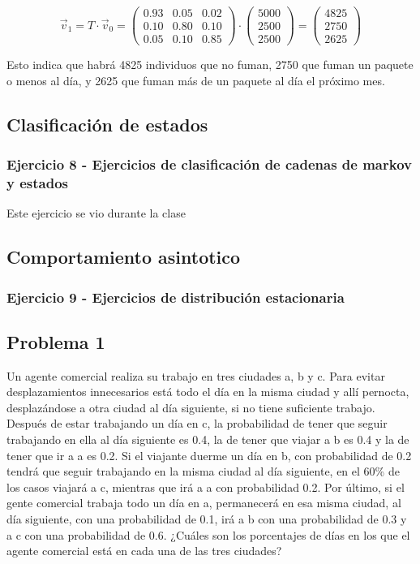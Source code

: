 \documentclass{article}
\begin{document}
\[
    \vec{v}_1 = T \cdot \vec{v}_0 = \begin{pmatrix}
        0.93 & 0.05 & 0.02 \\
        0.10 & 0.80 & 0.10 \\
        0.05 & 0.10 & 0.85
    \end{pmatrix}
    \cdot
    \begin{pmatrix}
        5000 \\
        2500 \\
        2500
    \end{pmatrix}
    =
    \begin{pmatrix}
        4825 \\
        2750 \\
        2625
    \end{pmatrix}
\]

Esto indica que habrá 4825 individuos que no fuman, 2750 que fuman un paquete o menos al día, y 2625 que fuman más de un paquete al día el próximo mes.

\subsection{Clasificación de estados}

\subsubsection{Ejercicio 8 - Ejercicios de clasificación de cadenas  de markov y estados}

Este ejercicio se vio durante la clase

\subsection{Comportamiento asintotico}

\subsubsection{Ejercicio 9 - Ejercicios de distribución estacionaria}

\subsection*{Problema 1}

Un agente comercial realiza su trabajo en tres ciudades a, b y c. Para evitar desplazamientos innecesarios está todo el día en la misma ciudad y allí pernocta, desplazándose a otra ciudad al día siguiente, si no tiene suficiente trabajo. Después de estar trabajando un día en c, la probabilidad de tener que seguir trabajando en ella al día siguiente es 0.4, la de tener que viajar a b es 0.4 y la de tener que ir a a es 0.2. Si el viajante duerme un día en b, con probabilidad de 0.2 tendrá que seguir trabajando en la misma ciudad al día siguiente, en el 60\% de los casos viajará a c, mientras que irá a a con probabilidad 0.2. Por último, si el gente comercial trabaja todo un día en a, permanecerá en esa misma ciudad, al día siguiente, con una probabilidad de 0.1, irá a b con una probabilidad de 0.3 y a c con una probabilidad de 0.6. ¿Cuáles son los porcentajes de días en los que el agente comercial está en cada una de las tres ciudades?
\end{document}
